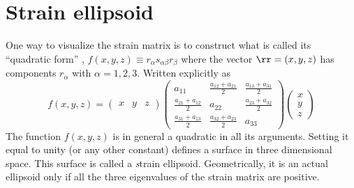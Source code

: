 \documentclass{tufte-book} %
\begin{document}
\section{Strain ellipsoid}
\label{sec:strain_ellipsoid}
One way to visualize the strain matrix is to construct what is called
its ``quadratic form'' , $f(x,y,z) \equiv
r_{\alpha}s_{\alpha\beta}r_{\beta} $
where the vector $\rr = (x,y,z)$ has components $r_{\alpha}$ with
$\alpha=1,2,3$. Written explicitly as
\begin{equation}
f(x,y,z) = 
\begin{pmatrix}
x & y & z 
\end{pmatrix}
\begin{pmatrix}
a_{11} & \frac{a_{12}+a_{21}}{2} &
    \frac{a_{13}+a_{31}}{2}  \\
\frac{a_{21}+a_{12}}{2} &  a_{22} &
    \frac{a_{23}+a_{32}}{2}  \\
\frac{a_{31}+a_{13}}{2} &
    \frac{a_{32}+a_{23}}{2} & a_{33} 
\end{pmatrix}
\begin{pmatrix}
x \\ y \\ z 
\end{pmatrix} 
\label{eq:ellipsoid}
\end{equation}
The function $f(x,y,z)$ is in general a quadratic in all its
arguments. Setting it equal to unity (or any other constant) defines a
surface in three dimensional space. This surface is called a {\textit strain
ellipsoid}. Geometrically, it is an actual ellipsoid only if all the
three eigenvalues of the strain matrix are positive.
% 
\end{document}
